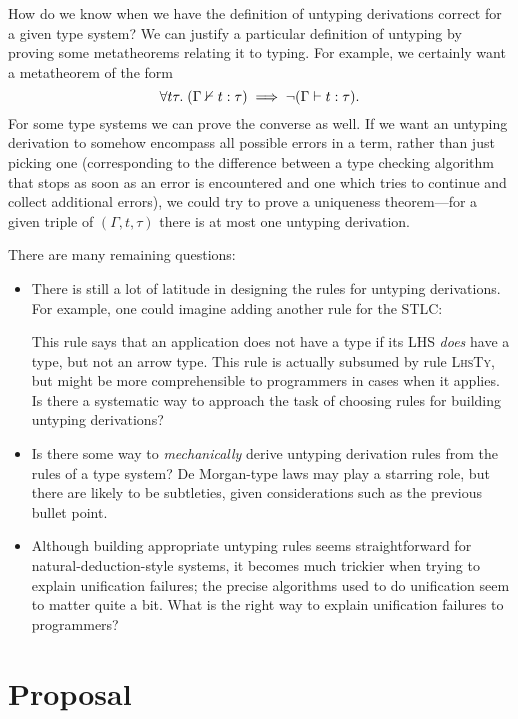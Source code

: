 \documentclass[sigplan, screen]{acmart}\settopmatter{printccs=false,printacmref=false}
\begin{document}
How do we know when we have the definition of untyping derivations
correct for a given type system?  We can justify a particular
definition of untyping by proving some metatheorems relating it to
typing.  For example, we certainly want a metatheorem of the form
\[ \forall t \tau.\; (\nty \Gamma t {\tau}) \implies \neg(\ty \Gamma t
  {\tau}). \] For some type systems we can prove the converse as well.
If we want an untyping derivation to somehow encompass all possible
errors in a term, rather than just picking one (corresponding to the
difference between a type checking algorithm that stops as soon as an
error is encountered and one which tries to continue and collect
additional errors), we could try to prove a uniqueness theorem---for a
given triple of $(\Gamma, t, \tau)$ there is at most one untyping
derivation.

There are many remaining questions:
\begin{itemize}
\item There is still a lot of latitude in designing the rules for
  untyping derivations.  For example, one could imagine adding another
  rule for the STLC:
  \begin{mathpar}
  \end{mathpar}
  This rule says that an application does not have a type if its LHS
  \emph{does} have a type, but not an arrow type.  This rule is
  actually subsumed by rule \textsc{LhsTy\frownie{}}, but might be
  more comprehensible to programmers in cases when it applies.  Is
  there a systematic way to approach the task of choosing rules for
  building untyping derivations?
\item Is there some way to \emph{mechanically} derive untyping
  derivation rules from the rules of a type system?  De Morgan-type
  laws may play a starring role, but there are likely to be
  subtleties, given considerations such as the previous bullet point.
\item Although building appropriate untyping rules seems straightforward
  for natural-deduction-style systems, it becomes much trickier when
  trying to explain unification failures; the precise algorithms used
  to do unification seem to matter quite a bit.  What is the right way
  to explain unification failures to programmers?
\end{itemize}

\section{Proposal}
\end{document}
